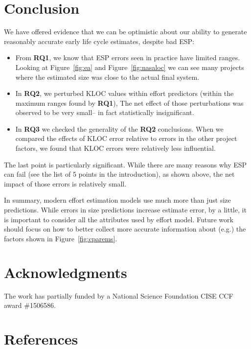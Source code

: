 \documentclass[final,twocolumn]{elsarticle}
\newcommand{\bi}{\begin{itemize}[leftmargin=0.4cm]}
\newcommand{\ei}{\end{itemize}}
\newcommand{\fig}[1]{Figure~\ref{fig:#1}}
\theoremstyle{break}
\begin{document}
 
\section{Conclusion}

We have offered  evidence that we can be optimistic about
our ability to generate reasonably accurate early life cycle estimates, despite bad ESP:
\bi
\item
  From {\bf RQ1},
  we know that ESP errors seen in practice have limited
  ranges. Looking at \fig{ea} and \fig{nasaloc} we can see many projects where the estimated
  size was close to the actual final system.
  
\item
  In {\bf RQ2},
  we perturbed KLOC values within effort predictors
  (within the 
  maximum ranges found by {\bf RQ1}),
  The net effect of those perturbations was observed to
  be very small-- in fact statistically insignificant.
\item
  In {\bf RQ3} we checked the generality of the {\bf RQ2} conclusions.
  When we
compared the effects of KLOC error relative to errors in the other project
factors, we found that KLOC errors were  relatively less 
influential.
\ei
The last point is particularly significant. While there are many reasons why ESP
can fail (see the list of 5 points in the introduction), as shown above, the net
impact of those errors is relatively small. 


In summary,
modern effort estimation models use much more than just size predictions.
While errors in size predictions increase estimate error, by a little,
it is important to consider all the attributes used by  effort model.
Future work should focus on how to better collect more accurate information about (e.g.)
the factors  shown in \fig{cparems}.  

\section*{Acknowledgments}
The work has partially funded by a National Science Foundation CISE CCF award \#1506586.
 

 
% 
\section*{References}
\small

  
\balance
   
\end{document}

